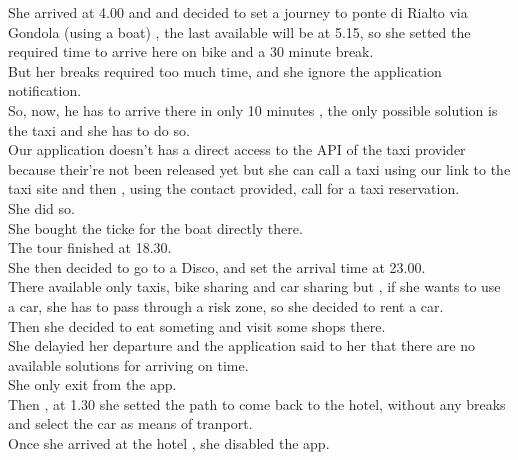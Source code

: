 \documentclass[a4paper,leqno]{book}
\begin{document}
She arrived at 4.00 and and decided to set a journey to ponte di Rialto via Gondola (using a boat) , the last available will be at 5.15, so she setted the required time to arrive here on bike and a 30 minute break.\\
But her breaks required too much time, and she ignore the application notification.\\
So, now, he has to arrive there in only 10 minutes , the only possible solution is the taxi and she has to do so.\\
Our application doesn't has a direct access to the API of the taxi provider because their're not been released yet but she can call a taxi using our link to the taxi site and then , using the contact provided, call for a taxi reservation.\\
She did so.\\
She bought the ticke for the boat directly there.\\
The tour finished at 18.30.\\
She then decided to go to a Disco, and set the arrival time at 23.00.\\
There available only taxis, bike sharing and car sharing but , if she wants to use a car, she has to pass through a risk zone, so she decided to rent a car.\\
Then she decided to eat someting and visit some shops there.\\
She delayied her departure and the application said to her that there are no available solutions for arriving on time.\\
She only exit from the app.\\
Then , at 1.30 she setted the path to come back to the hotel, without any breaks and select the car as means of tranport.\\
Once she arrived at the hotel , she disabled the app.\\
\end{document}
